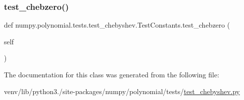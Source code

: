 \subsubsection{\texorpdfstring{test\+\_\+chebzero()}{test\_chebzero()}}
{\footnotesize\ttfamily def numpy.\+polynomial.\+tests.\+test\+\_\+chebyshev.\+Test\+Constants.\+test\+\_\+chebzero (\begin{DoxyParamCaption}\item[{}]{self }\end{DoxyParamCaption})}



The documentation for this class was generated from the following file\+:\begin{DoxyCompactItemize}
\item 
venv/lib/python3./site-\/packages/numpy/polynomial/tests/\hyperlink{test__chebyshev_8py}{test\+\_\+chebyshev.\+py}\end{DoxyCompactItemize}
